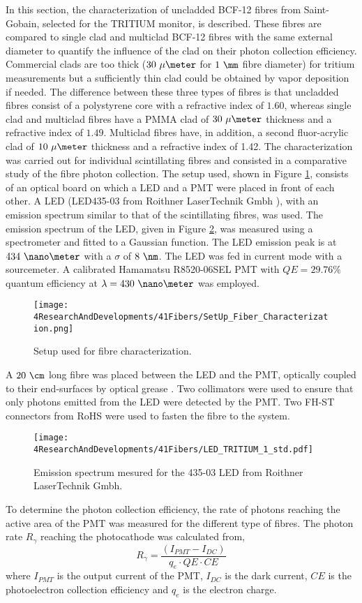 In this section, the characterization of uncladded BCF-12 fibres from Saint-Gobain, selected for the TRITIUM monitor, is described. These fibres are compared to single clad and multiclad BCF-12 fibres with the same external diameter to quantify the influence of the clad on their photon collection efficiency. Commercial clads are too thick ($30~\mu\meter$ for $1~\mm$ fibre diameter) for tritium measurements but a sufficiently thin clad could be obtained by vapor deposition if needed. The difference between these three types of fibres is that uncladded fibres consist of a polystyrene core with a refractive index of $1.60$, whereas single clad and multiclad fibres have a PMMA clad of $30~\mu\meter$ thickness and a refractive index of $1.49$. Multiclad fibres have, in addition, a second fluor-acrylic clad of $10~\mu\meter$ thickness and a refractive index of 1.42. The characterization was carried out for individual scintillating fibres and consisted in a comparative study of the fibre photon collection. The setup used, shown in Figure \ref{fig:SetUpFiberCharacterization}, consists of an optical board on which a LED and a PMT were placed in front of each other. A LED (LED435-03 from Roithner LaserTechnik Gmbh \cite{LEDRLT}), with an emission spectrum similar to that of the scintillating fibres, was used. The emission spectrum of the LED, given in Figure \ref{fig:LEDSpectrumTritium}, was measured using a spectrometer and fitted to a Gaussian function. The LED emission peak is at $434~\nano\meter$ with a $\sigma$ of $8~\nm$. The LED was fed in current mode with a sourcemeter. A calibrated Hamamatsu R8520-06SEL PMT with $QE=29.76\%$ quantum efficiency at $\lambda=430~\nano\meter$ was employed. 
\begin{figure}[h]
\centering
\texttt{[image: 4ResearchAndDevelopments/41Fibers/SetUp\_Fiber\_Characterization.png]}
\caption{Setup used for fibre characterization.\label{fig:SetUpFiberCharacterization}}
\end{figure}
A $20~\cm$ long fibre was placed between the LED and the PMT, optically coupled to their end-surfaces by optical grease \cite{OpticalGrease}. Two collimators were used to ensure that only photons emitted from the LED were detected by the PMT. Two FH-ST connectors from RoHS \cite{} were used to fasten the fibre to the system. 
\begin{figure}[h]
\centering
\texttt{[image: 4ResearchAndDevelopments/41Fibers/LED\_TRITIUM\_1\_std.pdf]}
\caption{Emission spectrum mesured for the 435-03 LED from Roithner LaserTechnik Gmbh.\label{fig:LEDSpectrumTritium}}
\end{figure}
To determine the photon collection efficiency, the rate of photons reaching the active area of the PMT was measured for the different type of fibres. The photon rate $R_{\gamma}$ reaching the photocathode was calculated from,
\begin{equation}
R_{\gamma} = \frac{\left( I_{PMT} - I_{DC} \right)}{q_e \cdot{} QE \cdot{} CE}
\label{eq:NumPhotonsFromIntensityPMT}
\end{equation}
where $I_{PMT}$ is the output current of the PMT, $I_{DC}$ is the dark current, $CE$ is the photoelectron collection efficiency and $q_e$ is the electron charge.